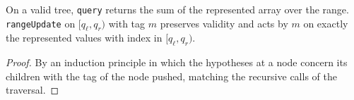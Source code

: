 \begin{theorem}
  \label{thm:lazy-segment-tree-correct}
  \leanok
  On a valid tree, \texttt{query} returns the sum of the represented array over the range.
  \texttt{rangeUpdate} on $[q_\ell, q_r)$ with tag $m$ preserves validity and acts by $m$
  on exactly the represented values with index in $[q_\ell, q_r)$.
\end{theorem}
\begin{proof}
  \leanok
  By an induction principle in which the hypotheses at a node concern its children with
  the tag of the node pushed, matching the recursive calls of the traversal.
\end{proof}
